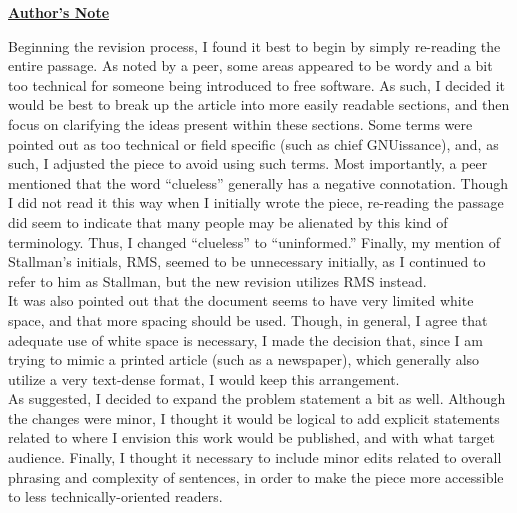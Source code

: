 \documentclass[12pt]{article}
\begin{document}
\begin{tcolorbox}

  \begin{center}
    \underline{\textbf{Author's Note}}
  \end{center}

  \begin{flushleft}
    \hspace{.5in} Beginning the revision process, I found it best to begin by simply re-reading the entire passage. As noted by a peer, some areas appeared to be wordy and a bit too technical for someone being introduced to free software. As such, I decided it would be best to break up the article into more easily readable sections, and then focus on clarifying the ideas present within these sections. Some terms were pointed out as too technical or field specific (such as chief GNUissance), and, as such, I adjusted the piece to avoid using such terms. Most importantly, a peer mentioned that the word “clueless” generally has a negative connotation. Though I did not read it this way when I initially wrote the piece, re-reading the passage did seem to indicate that many people may be alienated by this kind of terminology. Thus, I changed “clueless” to “uninformed.” Finally, my mention of Stallman's initials, RMS, seemed to be unnecessary initially, as I continued to refer to him as Stallman, but the new revision utilizes RMS instead.\\
  \hspace{.5in} It was also pointed out that the document seems to have very limited white space, and that more spacing should be used. Though, in general, I agree that adequate use of white space is necessary, I made the decision that, since I am trying to mimic a printed article (such as a newspaper), which generally also utilize a very text-dense format, I would keep this arrangement.\\
  \hspace{.5in} As suggested, I decided to expand the problem statement a bit as well. Although the changes were minor, I thought it would be logical to add explicit statements related to where I envision this work would be published, and with what target audience. Finally, I thought it necessary to include minor edits related to overall phrasing and complexity of sentences, in order to make the piece more accessible to less technically-oriented readers.
\end{flushleft}

\end{tcolorbox}
\end{document}
